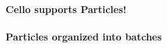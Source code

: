 \NEWSEC

\subsection{\ssRecentParticles}

%
%
%
%

\begin{frame}[fragile,label=ss-recent-particles] 
  \secframetitle{\ssRecentParticles}
  \framesubtitle{Cello supports Particles!}
\end{frame}

%
%
%
%

\begin{frame}[fragile,label=ss-recent-particles] 
  \secframetitle{\ssRecentParticles}
  \framesubtitle{Particles organized into batches}
\end{frame}

%
%
%
%


